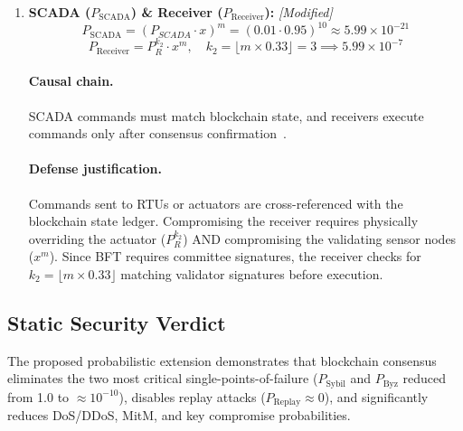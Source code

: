 \documentclass[10pt,twocolumn,journal]{IEEEtran}
\begin{document}
\begin{enumerate}[leftmargin=*]
    \paragraph{Causal chain.} Key shares are distributed across independent execution environments. The attacker must compromise at least three shares simultaneously to sign blocks~\cite{sridhar2012}.

    \item \textbf{SCADA ($P_{\mathrm{SCADA}}$) \& Receiver ($P_{\mathrm{Receiver}}$):} \emph{[Modified]}
    \begin{equation}
    \label{eq:scada_bc}
    P_{\mathrm{SCADA}} = (P_{SCADA} \cdot x)^m = (0.01 \cdot 0.95)^{10} \approx 5.99 \times 10^{-21}
    \end{equation}
    \begin{equation}
    \label{eq:receiver_bc}
    P_{\mathrm{Receiver}} = P_R^{k_2} \cdot x^m, \quad k_2 = \lfloor m \times 0.33 \rfloor = 3 \implies 5.99 \times 10^{-7}
    \end{equation}
    \paragraph{Causal chain.} SCADA commands must match blockchain state, and receivers execute commands only after consensus confirmation~\cite{sheikh2020}.
    \paragraph{Defense justification.} Commands sent to RTUs or actuators are cross-referenced with the blockchain state ledger. Compromising the receiver requires physically overriding the actuator ($P_R^{k_2}$) AND compromising the validating sensor nodes ($x^m$). Since BFT requires committee signatures, the receiver checks for $k_2 = \lfloor m \times 0.33 \rfloor$ matching validator signatures before execution.
\end{enumerate}

\subsection{Static Security Verdict}
\label{sec:static_verdict}

The proposed probabilistic extension demonstrates that blockchain consensus eliminates the two most critical single-points-of-failure ($P_{\mathrm{Sybil}}$ and $P_{\mathrm{Byz}}$ reduced from 1.0 to $\approx 10^{-10}$), disables replay attacks ($P_{\mathrm{Replay}} \approx 0$), and significantly reduces DoS/DDoS, MitM, and key compromise probabilities. 
\end{document}
